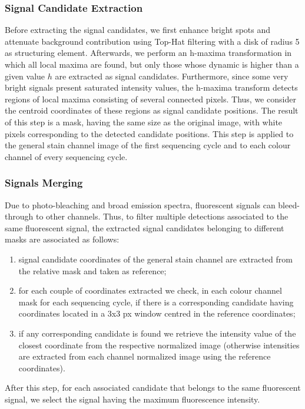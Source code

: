 \documentclass[10pt,journal]{IEEEtran}
\begin{document}
\subsubsection{Signal Candidate Extraction}
Before extracting the signal candidates, we first enhance bright spots and attenuate background contribution using Top-Hat filtering with a disk of radius 5 as structuring element.
Afterwards, we perform an h-maxima transformation \cite{soille2013morphological} in which all local maxima are found, but only those whose dynamic is higher than a given value \(h\) %
are extracted as signal candidates.
Furthermore, since some very bright signals present saturated intensity values, the h-maxima transform detects regions of local maxima consisting of several connected pixels. Thus, we consider the centroid coordinates  of these regions as signal candidate positions.
The result of this step is a mask, having the same size as the original image, with white pixels corresponding to the detected candidate positions.
This step is applied to the general stain channel image of the first sequencing cycle and to each colour channel of every sequencing cycle.


\subsubsection{Signals Merging}
Due to photo-bleaching and broad emission spectra, fluorescent signals can bleed-through to other channels. Thus, to filter multiple detections associated to the same fluorescent signal, the extracted signal candidates belonging to different masks are associated as follows:
\begin{enumerate}
    \item signal candidate coordinates of the general stain channel are extracted from the relative mask and taken as reference;
    \item for each couple of coordinates extracted we check, in each colour channel mask for each sequencing cycle, if there is a corresponding candidate having coordinates located in a 3x3 px window centred in the reference coordinates;
    \item if any corresponding candidate is found we retrieve the intensity value of the closest coordinate from the respective normalized image (otherwise intensities are extracted from each channel normalized image using the reference coordinates).
\end{enumerate}
After this step, for each associated candidate that belongs to the same fluorescent signal, we select the signal having the maximum fluorescence intensity.
\end{document}
